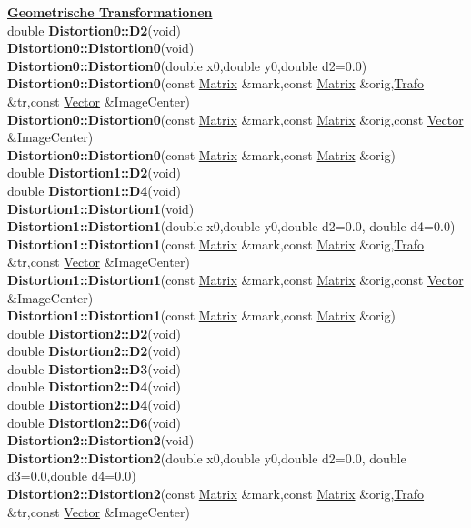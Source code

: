 \documentclass[10pt,titlepage]{article}
\newcommand{\subtitle}[1]{{\noindent\bf#1}}
\def\functionlistentry#1#2#3#4#5#6{\noindent #1 {\bf #2}(#3) \dotfill #6\\}
\begin{document}
{{\subtitle{\hyperlink{SECTION:geoTrafo}{Geometrische Transformationen}}\\
\functionlistentry{double}{Distortion0::D2}{void}{750}{geoTrafo}{}
\functionlistentry{}{Distortion0::Distortion0}{void}{728}{geoTrafo}{}
\functionlistentry{}{Distortion0::Distortion0}{double x0,double y0,double d2=0.0}{732}{geoTrafo}{}
\functionlistentry{}{Distortion0::Distortion0}{const \hyperlink{Matrix}{Matrix} \&mark,const \hyperlink{Matrix}{Matrix} \&orig,\hyperlink{Trafo}{Trafo} \&tr,const \hyperlink{Vector}{Vector} \&ImageCenter}{736}{geoTrafo}{}
\functionlistentry{}{Distortion0::Distortion0}{const \hyperlink{Matrix}{Matrix} \&mark,const \hyperlink{Matrix}{Matrix} \&orig,const \hyperlink{Vector}{Vector} \&ImageCenter}{737}{geoTrafo}{}
\functionlistentry{}{Distortion0::Distortion0}{const \hyperlink{Matrix}{Matrix} \&mark,const \hyperlink{Matrix}{Matrix} \&orig}{738}{geoTrafo}{}
\functionlistentry{double}{Distortion1::D2}{void}{751}{geoTrafo}{}
\functionlistentry{double}{Distortion1::D4}{void}{752}{geoTrafo}{}
\functionlistentry{}{Distortion1::Distortion1}{void}{729}{geoTrafo}{}
\functionlistentry{}{Distortion1::Distortion1}{double x0,double y0,double d2=0.0, double d4=0.0}{733}{geoTrafo}{}
\functionlistentry{}{Distortion1::Distortion1}{const \hyperlink{Matrix}{Matrix} \&mark,const \hyperlink{Matrix}{Matrix} \&orig,\hyperlink{Trafo}{Trafo} \&tr,const \hyperlink{Vector}{Vector} \&ImageCenter}{739}{geoTrafo}{}
\functionlistentry{}{Distortion1::Distortion1}{const \hyperlink{Matrix}{Matrix} \&mark,const \hyperlink{Matrix}{Matrix} \&orig,const \hyperlink{Vector}{Vector} \&ImageCenter}{740}{geoTrafo}{}
\functionlistentry{}{Distortion1::Distortion1}{const \hyperlink{Matrix}{Matrix} \&mark,const \hyperlink{Matrix}{Matrix} \&orig}{741}{geoTrafo}{}
\functionlistentry{double}{Distortion2::D2}{void}{753}{geoTrafo}{}
\functionlistentry{double}{Distortion2::D2}{void}{756}{geoTrafo}{}
\functionlistentry{double}{Distortion2::D3}{void}{754}{geoTrafo}{}
\functionlistentry{double}{Distortion2::D4}{void}{755}{geoTrafo}{}
\functionlistentry{double}{Distortion2::D4}{void}{757}{geoTrafo}{}
\functionlistentry{double}{Distortion2::D6}{void}{758}{geoTrafo}{}
\functionlistentry{}{Distortion2::Distortion2}{void}{730}{geoTrafo}{}
\functionlistentry{}{Distortion2::Distortion2}{double x0,double y0,double d2=0.0, double d3=0.0,double d4=0.0}{734}{geoTrafo}{}
\functionlistentry{}{Distortion2::Distortion2}{const \hyperlink{Matrix}{Matrix} \&mark,const \hyperlink{Matrix}{Matrix} \&orig,\hyperlink{Trafo}{Trafo} \&tr,const \hyperlink{Vector}{Vector} \&ImageCenter}{742}{geoTrafo}{}
}}
\end{document}
